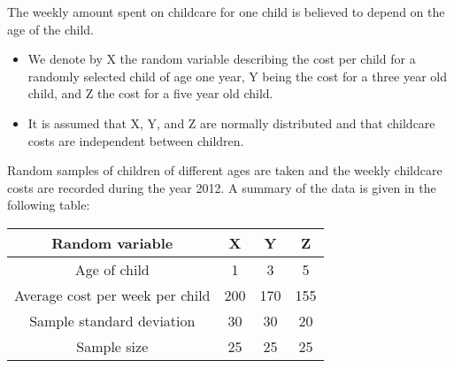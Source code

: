 \documentclass[a4paper,12pt]{article}
\begin{document}
The weekly amount spent on childcare for one child is believed to depend on the age of the child. 
\begin{itemize}
    \item We denote by X the random variable describing the cost per child for a randomly selected child of age one year, Y being the cost for a three year old child, and Z the cost for a five year old child. 
    \item It is assumed that X, Y, and Z are normally distributed and that childcare costs are independent between children.
\end{itemize} Random samples of children of different ages are taken and the weekly childcare costs are
recorded during the year 2012. A summary of the data is given in the following table:
\begin{center}
\begin{tabular}{cccc}
Random variable &  X &  Y &  Z \\ \hline
Age of child & 1 & 3 &  5 \\ \hline
Average cost per week per child & 200 & 170 & 155 \\ \hline
Sample standard deviation &  30 & 30 & 20 \\ \hline
Sample size & 25 & 25 & 25 \\ \hline
\end{tabular}
\end{center}
\end{document}
